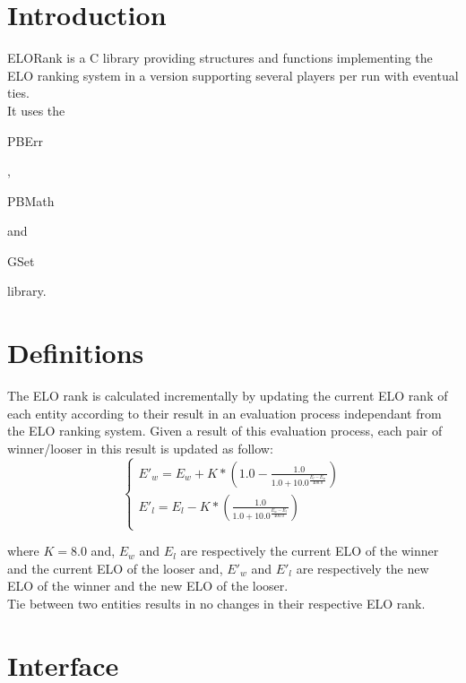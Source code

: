 \section*{Introduction}

ELORank is a C library providing structures and functions implementing the ELO ranking system in a version supporting several players per run with eventual ties.\\ 

It uses the \begin{ttfamily}PBErr\end{ttfamily}, \begin{ttfamily}PBMath\end{ttfamily} and \begin{ttfamily}GSet\end{ttfamily} library.\\

\section{Definitions}

The ELO rank is calculated incrementally by updating the current ELO rank of each entity according to their result in an evaluation process independant from the ELO ranking system. Given a result of this evaluation process, each pair of winner/looser in this result is updated as follow:\\

\begin{equation}
\left\lbrace
\begin{array}{l}
E'_w=E_w+K*\left(1.0-\frac{1.0}{1.0+10.0^{\frac{E_l-E_w}{400.0}}}\right)\\
E'_l=E_l-K*\left(\frac{1.0}{1.0+10.0^{\frac{E_w-E_l}{400.0}}}\right)\\
\end{array}
\right.
\end{equation}

where $K=8.0$ and, $E_w$ and $E_l$ are respectively the current ELO of the winner and the current ELO of the looser and, $E'_w$ and $E'_l$ are respectively the new ELO of the winner and the new ELO of the looser.\\

Tie between two entities results in no changes in their respective ELO rank.

\section{Interface}

